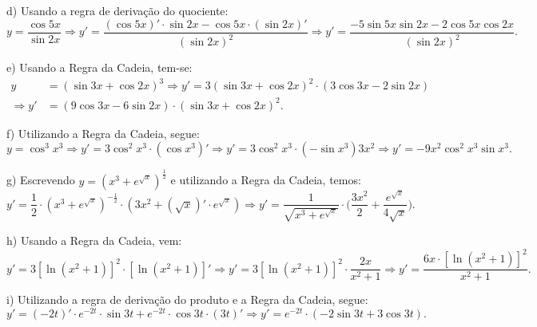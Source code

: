 \documentclass{article}
\begin{document}
{\begin{newpage}
\par
\vspace{0.3cm}
d) Usando a regra de derivação do quociente:
\begin{equation*} y=\displaystyle{\frac{\cos{5x}}{\sin{2x}} \Rightarrow y'= \frac{(\cos{5x})'\cdot\sin{2x} - \cos{5x}\cdot (\sin{2x})'}{(\sin{2x})^2} \Rightarrow y'=\frac{-5\sin{5x}\sin{2x} - 2\cos{5x}\cos{2x}}{(\sin{2x})^2}} .\end{equation*}
\par
\vspace{0.3cm}
e) Usando a Regra da Cadeia, tem-se:
\begin{equation*} \begin{split}
y&=(\sin{3x} + \cos{2x})^3 \Rightarrow y'=3(\sin{3x} + \cos{2x})^{2}\cdot (3\cos{3x} - 2\sin{2x}) \\
\Rightarrow y'&=(9\cos{3x} - 6\sin{2x})\cdot (\sin{3x} + \cos{2x})^{2}.\end{split} \end{equation*}
\par
\vspace{0.3cm}
f) Utilizando a Regra da Cadeia, segue:
\begin{equation*} y=\cos^{3}{x^3} \Rightarrow y'=3\cos^{2}{x^3}\cdot (\cos{x^3})' \Rightarrow y'=3\cos^{2}{x^3}\cdot (-\sin{x^3})3x^2 \Rightarrow y'=-9x^{2}\cos^{2}{x^3}\sin{x^3} .\end{equation*}
\par
\vspace{0.3cm}
g) Escrevendo $y=\displaystyle{(x^3 + e^{\sqrt{x}})^{\frac{1}{2}}}$ e utilizando a Regra da Cadeia, temos:
\begin{equation*} y'=\displaystyle{\frac{1}{2}\cdot (x^3 + e^{\sqrt{x}})^{-\frac{1}{2}}\cdot (3x^2 + (\sqrt{x})'\cdot e^{\sqrt{x}}) \Rightarrow y'=\frac{1}{\sqrt{x^3 + e^{\sqrt{x}}}}\cdot \Big(\frac{3x^2}{2} + \frac{e^{\sqrt{x}}}{4\sqrt{x}}\Big)} .\end{equation*}
\par
\vspace{0.3cm}
h) Usando a Regra da Cadeia, vem:
\begin{equation*}\displaystyle{ y'=3[\ln{(x^2 + 1)}]^{2}\cdot [\ln{(x^2 + 1)}]' \Rightarrow y'=3[\ln{(x^2 + 1)}]^{2}\cdot\frac{2x}{x^2 + 1} \Rightarrow y'=\frac{6x\cdot [\ln{(x^2 + 1)}]^{2}}{x^2 + 1}} .\end{equation*}
\par
\vspace{0.3cm}
i) Utilizando a regra de derivação do produto e a Regra da Cadeia, segue:
\begin{equation*} y'=(-2t)'\cdot e^{-2t}\cdot\sin{3t} + e^{-2t}\cdot\cos{3t}\cdot (3t)' \Rightarrow y'=e^{-2t}\cdot (-2\sin{3t} + 3\cos{3t}) .\end{equation*}
\par
\vspace{0.3cm}

\end{newpage}}
\end{document}
